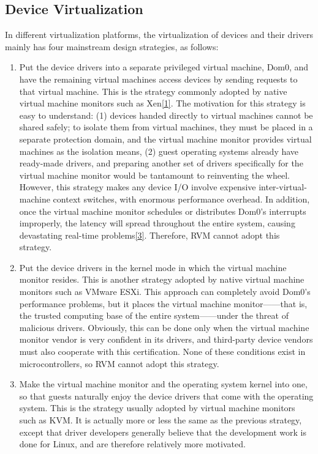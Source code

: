 \subsection{Device Virtualization}\label{subsec:2-2-5}

In different virtualization platforms, the virtualization of devices and their drivers mainly has four mainstream design strategies, as follows:

\begin{enumerate}
\def\labelenumi{{[}\arabic{enumi}{]}}
\item
  Put the device drivers into a separate privileged virtual machine, Dom0, and have the remaining virtual machines access devices by sending requests to that virtual machine. This is the strategy commonly adopted by native virtual machine monitors such as Xen\protect\hyperref[cite:2-1]{{[}1{]}}. The motivation for this strategy is easy to understand: (1) devices handed directly to virtual machines cannot be shared safely; to isolate them from virtual machines, they must be placed in a separate protection domain, and the virtual machine monitor provides virtual machines as the isolation means, (2) guest operating systems already have ready-made drivers, and preparing another set of drivers specifically for the virtual machine monitor would be tantamount to reinventing the wheel. However, this strategy makes any device I/O involve expensive inter-virtual-machine context switches, with enormous performance overhead. In addition, once the virtual machine monitor schedules or distributes Dom0's interrupts improperly, the latency will spread throughout the entire system, causing devastating real-time problems\protect\hyperref[cite:2-3]{{[}3{]}}. Therefore, RVM cannot adopt this strategy.
\item
  Put the device drivers in the kernel mode in which the virtual machine monitor resides. This is another strategy adopted by native virtual machine monitors such as VMware ESXi. This approach can completely avoid Dom0's performance problems, but it places the virtual machine monitor------that is, the trusted computing base of the entire system------under the threat of malicious drivers. Obviously, this can be done only when the virtual machine monitor vendor is very confident in its drivers, and third-party device vendors must also cooperate with this certification. None of these conditions exist in microcontrollers, so RVM cannot adopt this strategy.
\item
  Make the virtual machine monitor and the operating system kernel into one, so that guests naturally enjoy the device drivers that come with the operating system. This is the strategy usually adopted by virtual machine monitors such as KVM. It is actually more or less the same as the previous strategy, except that driver developers generally believe that the development work is done for Linux, and are therefore relatively more motivated.

\end{enumerate}
